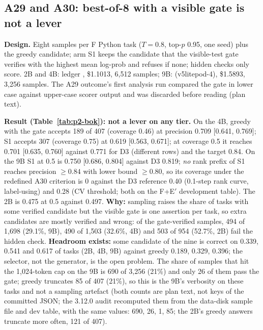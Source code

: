 \documentclass[11pt,a4paper]{article}
\newcommand{\code}[1]{\texttt{\detokenize{#1}}}
\begin{document}
\subsection{A29 and A30: best-of-8 with a visible gate is not a lever}\label{sec:p2-bok}

\textbf{Design.} Eight samples per F Python task ($T=0.8$, top-$p$ 0.95, one seed) plus the greedy candidate; arm S1 keeps the candidate that the visible-test gate verifies with the highest mean log-prob and refuses if none; hidden checks only score. 2B and 4B: ledger \code{tpu_f-sample-221616}, \$1.1013, 6,512 samples; 9B: \code{tpu_f-sample-9b-084710} (v5litepod-4), \$1.5893, 3,256 samples. The A29 outcome's first analysis run compared the gate in lower case against upper-case scorer output and was discarded before reading (plan text).

\textbf{Result (Table~\ref{tab:p2-bok}): not a lever on any tier.} On the 4B, greedy with the gate accepts 189 of 407 (coverage 0.46) at precision 0.709 [0.641, 0.769]; S1 accepts 307 (coverage 0.75) at 0.619 [0.563, 0.671]; at coverage 0.5 it reaches 0.701 [0.635, 0.760] against 0.771 for D3 \code{lr|core} (different rows) and the target 0.84. On the 9B S1 at 0.5 is 0.750 [0.686, 0.804] against D3 0.819; \emph{no} rank prefix of S1 reaches precision $\ge0.84$ with lower bound $\ge0.80$, so its coverage under the redefined A30 criterion is 0 against the D3 reference 0.40 (0.1-step rank curve, label-using) and 0.28 (CV threshold; both on the F+E$'$ development table). The 2B is 0.475 at 0.5 against 0.497. \textbf{Why:} sampling raises the share of tasks with some verified candidate but the visible gate is one assertion per task, so extra candidates are mostly verified and wrong: of the gate-verified samples, 494 of 1,698 (29.1\%, 9B), 490 of 1,503 (32.6\%, 4B) and 503 of 954 (52.7\%, 2B) fail the hidden check. \textbf{Headroom exists:} some candidate of the nine is correct on 0.339, 0.541 and 0.617 of tasks (2B, 4B, 9B) against greedy 0.189, 0.329, 0.396; the selector, not the generator, is the open problem. The share of samples that hit the 1,024-token cap on the 9B is 690 of 3,256 (21\%) and only 26 of them pass the gate; greedy truncates 85 of 407 (21\%), so this is the 9B's verbosity on these tasks and not a sampling artefact (both counts are plan text, not keys of the committed JSON; the 3.12.0 audit recomputed them from the data-disk sample file and dev table, with the same values: 690, 26, 1, 85; the 2B's greedy answers truncate more often, 121 of 407).
\end{document}
